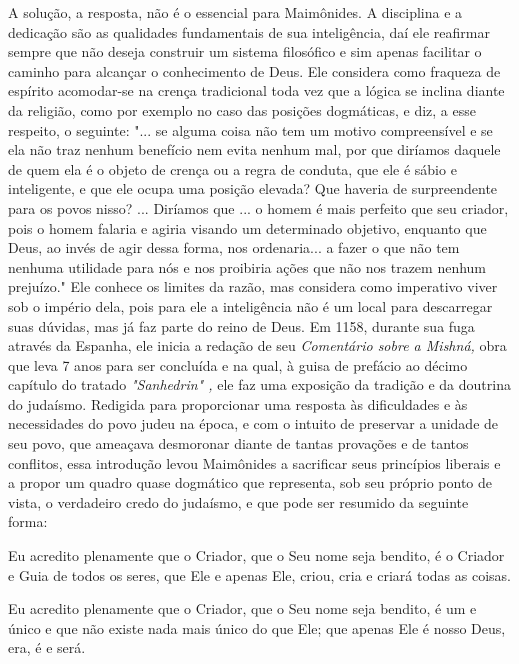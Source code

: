 \begin{itemize}
A solução, a resposta, não é o essencial para Maimônides. A disciplina
e a dedicação são as qualidades fundamentais de sua inteligência, daí
ele reafirmar
sempre que não deseja construir um sistema filosófico e sim
apenas facilitar
o caminho para alcançar o conhecimento de Deus. Ele considera como
fraqueza de espírito acomodar-se na crença tradicional toda vez que a lógica
se inclina diante da religião, como por exemplo no caso das posições
dogmáticas, e diz, a esse respeito, o seguinte: "... se alguma coisa não tem um motivo
compreensível e se ela não traz nenhum benefício nem evita nenhum mal, por
que diríamos daquele de quem ela é o objeto de crença ou a regra de conduta,
que ele é sábio e inteligente, e que ele ocupa uma posição elevada? Que haveria
de surpreendente para os povos nisso? ... Diríamos que ... o homem é
mais perfeito que seu criador, pois o homem falaria e agiria visando um determinado
objetivo, enquanto que Deus, ao invés de agir dessa forma, nos ordenaria...
a fazer o que não tem nenhuma utilidade para nós e nos proibiria ações que
não nos trazem nenhum prejuízo." Ele conhece os limites da razão, mas
considera
como imperativo viver sob o império dela, pois para ele a
inteligência não
é um local para descarregar suas dúvidas, mas já faz parte do reino de Deus.
Em 1158, durante sua fuga através da Espanha, ele inicia a redação
de seu \emph{Comentário sobre a Mishná,} obra que leva 7 anos para ser
concluída e na qual, à guisa de prefácio ao décimo capítulo do tratado
\emph{"Sanhedrin" ,} ele faz uma exposição da tradição e da doutrina do
judaísmo. Redigida para pro­porcionar uma resposta às dificuldades e às
necessidades do povo judeu na épo­ca, e com o intuito de preservar a
unidade de seu povo, que ameaçava desmo­ronar diante de tantas provações
e de tantos conflitos, essa introdução levou Maimônides a sacrificar
seus princípios liberais e a propor um quadro quase dogmático que
representa, sob seu próprio ponto de vista, o verdadeiro credo do
judaísmo, e que pode ser resumido da seguinte forma:

\begin{enumrate}

\item Eu acredito plenamente que o Criador, que o Seu nome seja bendito, é o
Criador e Guia de todos os seres, que Ele e apenas Ele, criou, cria e
criará todas as coisas.

\item Eu acredito plenamente que o Criador, que o Seu nome seja bendito, é
um e único e que não existe nada mais único do que Ele; que apenas Ele
é nos­so Deus, era, é e será.


\end{enumrate}
\end{itemize}
